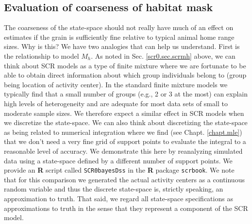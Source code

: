 \subsection{Evaluation of coarseness of habitat mask}

The coarseness of the state-space should not really have much of an
effect on estimates if the grain is sufficiently fine relative to
typical animal home range sizes.  Why is this?  We have two analogies
that can help us understand. First is the relationship to model
$M_{h}$.  As noted in Sec. \ref{scr0.sec.scrmh} above, we can think
about SCR models as a type of finite mixture
\citep{norris_pollock:1996, pledger:2000} where we are fortunate to be
able to obtain direct information about which group individuals belong
to (group being location of activity center).  In the standard finite
mixture models we typically find that a small number of groups (e.g.,
2 or 3 at the most) can explain  high levels of heterogeneity
and are adequate for most data sets of small to moderate sample
sizes. We therefore expect a similar effect in SCR models when we
discretize the state-space.  We can also think about discretizing the
state-space as being related to numerical integration where we find
(see Chapt. \ref{chapt.mle}) that we don't need a very fine grid of
support points to evaluate the integral to a reasonable level of
accuracy. We demonstrate this here by reanalyzing simulated data using
a state-space defined by a different number of support points.  We
provide an {\bf R} script called \mbox{\tt SCR0bayesDss} in the
{\bf R} package \mbox{\tt scrbook}.  We note that for this comparison
we generated the actual activity centers as a continuous random
variable and thus the discrete state-space is, strictly speaking, an
approximation to truth. That said, we regard all state-space
specifications as approximations to truth in the sense that they
represent a component of the SCR model.

